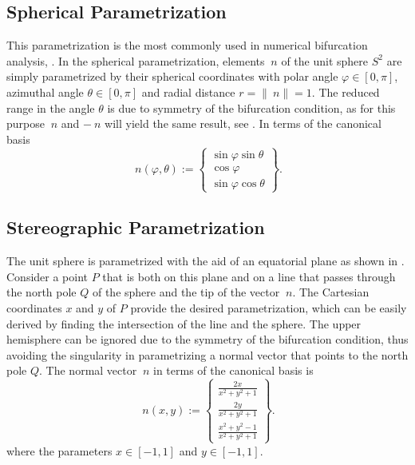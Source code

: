 \documentclass[12pt]{article}
\numberwithin{equation}{section}
\begin{document}
\subsection{Spherical Parametrization}
\label{subsec:spherical}

This parametrization is the most commonly used in numerical
bifurcation analysis, \eg \cite{Mosler:2005, Regueiro.Foster:2011}.
In the spherical parametrization, elements $~n$ of the unit sphere
$S^2$ are simply parametrized by their spherical coordinates with
polar angle $\varphi \in [0, \pi]$, azimuthal angle $\theta \in [0,
  \pi]$ and radial distance $r = \|~n \| = 1$. The reduced range in
the angle $\theta$ is due to symmetry of the bifurcation condition, as
for this purpose $~n$ and $- ~n$ will yield the same result, see
. In terms of the canonical basis
\begin{equation}
  ~n(\varphi, \theta)
  :=
  \begin{Bmatrix}
    \sin\varphi \sin\theta
    \\
    \cos\varphi
    \\
    \sin\varphi \cos\theta
  \end{Bmatrix}.
\end{equation}

\subsection{Stereographic Parametrization}
\label{subsec:stereographic}

The unit sphere is parametrized with the aid of an equatorial plane as
shown in .  Consider a point $P$ that is both
on this plane and on a line that passes through the north pole $Q$ of
the sphere and the tip of the vector $~n$. The Cartesian coordinates
$x$ and $y$ of $P$ provide the desired parametrization, which can be
easily derived by finding the intersection of the line and the
sphere. The upper hemisphere can be ignored due to the symmetry of the
bifurcation condition, thus avoiding the singularity in parametrizing
a normal vector that points to the north pole $Q$. The normal vector
$~n$ in terms of the canonical basis is
\begin{equation}
  ~n(x,y)
  :=
  \begin{Bmatrix}
    \frac{\displaystyle 2x}{\displaystyle x^2+y^2+1}
    \\[0.9em]
    \frac{\displaystyle 2y}{\displaystyle x^2+y^2+1}
    \\[0.9em]
    \frac{\displaystyle x^2+y^2-1}{\displaystyle x^2+y^2+1}
  \end{Bmatrix}.
\end{equation}
where the parameters $x \in [-1, 1]$ and $y \in [-1, 1]$.
\end{document}
